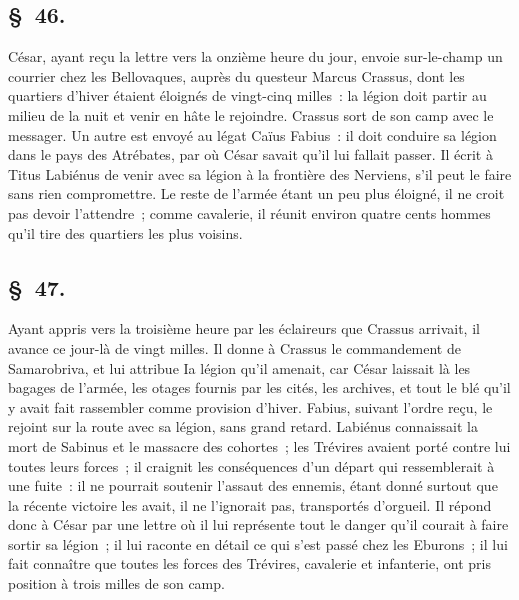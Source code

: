 \documentclass[french,twoside]{book} %
\begin{document}
\subsection[{§ 46.}]{ \textsc{§ 46.} }
\noindent César, ayant reçu la lettre vers la onzième heure du jour, envoie sur-le-champ un courrier chez les Bellovaques, auprès du questeur Marcus Crassus, dont les quartiers d’hiver étaient éloignés de vingt-cinq milles : la légion doit partir au milieu de la nuit et venir en hâte le rejoindre. Crassus sort de son camp avec le messager. Un autre est envoyé au légat Caïus Fabius : il doit conduire sa légion dans le pays des Atrébates, par où César savait qu’il lui fallait passer. Il écrit à Titus Labiénus de venir avec sa légion à la frontière des Nerviens, s’il peut le faire sans rien compromettre. Le reste de l’armée étant un peu plus éloigné, il ne croit pas devoir l’attendre ; comme cavalerie, il réunit environ quatre cents hommes qu’il tire des quartiers les plus voisins.
\subsection[{§ 47.}]{ \textsc{§ 47.} }
\noindent Ayant appris vers la troisième heure par les éclaireurs que Crassus arrivait, il avance ce jour-là de vingt milles. Il donne à Crassus le commandement de Samarobriva, et lui attribue Ia légion qu’il amenait, car César laissait là les bagages de l’armée, les otages fournis par les cités, les archives, et tout le blé qu’il y avait fait rassembler comme provision d’hiver. Fabius, suivant l’ordre reçu, le rejoint sur la route avec sa légion, sans grand retard. Labiénus connaissait la mort de Sabinus et le massacre des cohortes ; les Trévires avaient porté contre lui toutes leurs forces ; il craignit les conséquences d’un départ qui ressemblerait à une fuite : il ne pourrait soutenir l’assaut des ennemis, étant donné surtout que la récente victoire les avait, il ne l’ignorait pas, transportés d’orgueil. Il répond donc à César par une lettre où il lui représente tout le danger qu’il courait à faire sortir sa légion ; il lui raconte en détail ce qui s’est passé chez les Eburons ; il lui fait connaître que toutes les forces des Trévires, cavalerie et infanterie, ont pris position à trois milles de son camp.
\end{document}
